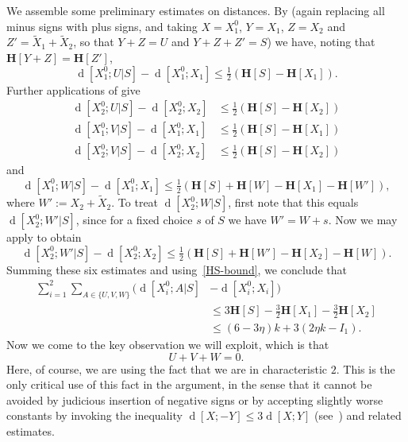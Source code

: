 \documentclass[12pt,reqno,tbtags]{amsart}
\theoremstyle{definition}
\theoremstyle{remark}
\renewcommand{\leq}{\leqslant}
\newcommand{\ent}[1]{\mathbf{H}[#1]}
\newcommand{\dist}[2]{{\operatorname{d}[#1;#2]}} %
\numberwithin{equation}{section}
\begin{document}
We assemble some preliminary estimates on distances. By  (again replacing all minus signs with plus signs, and taking $X = X_1^0$, $Y = X_1$, $Z = X_2$ and $Z' = \tilde X_1 + \tilde X_2$, so that $Y + Z = U$ and $Y + Z + Z' = S$) we have, noting that $\ent{Y+Z} = \ent{Z'}$,
\[
  \dist{X^0_1}{U|S} - \dist{X^0_1}{X_1} \leq \tfrac{1}{2} (\ent{S} -  \ent{X_1}).
\]
Further applications of  give
\begin{align*}
\dist{X^0_2}{U|S} - \dist{X^0_2}{X_2} &\leq \tfrac{1}{2} (\ent{S} -  \ent{X_2}) \\
\dist{X^0_1}{V|S} - \dist{X^0_1}{X_1} &\leq \tfrac{1}{2} (\ent{S} -  \ent{X_1})\\
\dist{X^0_2}{V|S} - \dist{X^0_2}{X_2} &\leq \tfrac{1}{2} (\ent{S} -  \ent{X_2})
\end{align*}
and
\[ \dist{X^0_1}{W|S} - \dist{X^0_1}{X_1} \leq \tfrac{1}{2} (\ent{S} + \ent{W} - \ent{X_1} - \ent{W'}),\] where $W' := X_2 + \tilde X_2$.
To treat $\dist{X^0_2}{W|S}$, first note that this equals $\dist{X^0_2}{W'|S}$, since for a fixed choice $s$ of $S$ we have $W' = W + s$. Now we may apply  to obtain
\[ \dist{X^0_2}{W'|S} - \dist{X^0_2}{X_2} \leq \tfrac{1}{2} (\ent{S} + \ent{W'} - \ent{X_2} - \ent{W}).\]
Summing these six estimates and using~\eqref{HS-bound}, we conclude that
\begin{align}
  \nonumber
  \sum_{i=1}^2 \sum_{A\in\{U,V,W\}} \big(\dist{X^0_i}{A|S} & - \dist{X^0_i}{X_i}\big) \\
    &\leq 3\ent{S} - \tfrac{3}{2} \ent{X_1} - \tfrac{3}{2}\ent{X_2} \nonumber \\
    &\leq (6 - 3\eta) k + 3(2 \eta k - I_1).
  \label{total-dist}
\end{align}
Now we come to the key observation we will exploit, which is that
\begin{equation}
\label{uvw-sum} U + V + W = 0.
\end{equation}
Here, of course, we are using the fact that we are in characteristic $2$.
This is the only critical use of this fact in the argument, in the sense that it cannot be avoided by judicious insertion of negative signs or by accepting slightly worse constants by invoking the inequality $\dist{X}{-Y} \leq 3 \dist{X}{Y}$ (see~\cite[Equation 17]{tao-entropy}) and related estimates.
\end{document}
